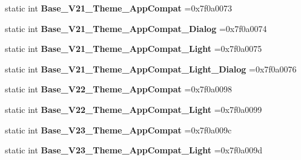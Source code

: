 \begin{DoxyCompactItemize}
static int {\bfseries Base\+\_\+\+V21\+\_\+\+Theme\+\_\+\+App\+Compat} =0x7f0a0073
\item 
\mbox{\label{classandroid_1_1support_1_1v7_1_1cardview_1_1R_1_1style_aefcd169fdb73165fb099d6b5d3257ef0}} 
static int {\bfseries Base\+\_\+\+V21\+\_\+\+Theme\+\_\+\+App\+Compat\+\_\+\+Dialog} =0x7f0a0074
\item 
\mbox{\label{classandroid_1_1support_1_1v7_1_1cardview_1_1R_1_1style_a4a02aac71d639ac5f302d376da529429}} 
static int {\bfseries Base\+\_\+\+V21\+\_\+\+Theme\+\_\+\+App\+Compat\+\_\+\+Light} =0x7f0a0075
\item 
\mbox{\label{classandroid_1_1support_1_1v7_1_1cardview_1_1R_1_1style_a4c6ac30e3b757ebf8f35eed8466346ec}} 
static int {\bfseries Base\+\_\+\+V21\+\_\+\+Theme\+\_\+\+App\+Compat\+\_\+\+Light\+\_\+\+Dialog} =0x7f0a0076
\item 
\mbox{\label{classandroid_1_1support_1_1v7_1_1cardview_1_1R_1_1style_ad559db67c0d62356014244b0c5908371}} 
static int {\bfseries Base\+\_\+\+V22\+\_\+\+Theme\+\_\+\+App\+Compat} =0x7f0a0098
\item 
\mbox{\label{classandroid_1_1support_1_1v7_1_1cardview_1_1R_1_1style_ac140cd6035d9bc7b85a6e93bdcbe0f8c}} 
static int {\bfseries Base\+\_\+\+V22\+\_\+\+Theme\+\_\+\+App\+Compat\+\_\+\+Light} =0x7f0a0099
\item 
\mbox{\label{classandroid_1_1support_1_1v7_1_1cardview_1_1R_1_1style_aaf5fe8797f658d6583b47cedc859b5d4}} 
static int {\bfseries Base\+\_\+\+V23\+\_\+\+Theme\+\_\+\+App\+Compat} =0x7f0a009c
\item 
\mbox{\label{classandroid_1_1support_1_1v7_1_1cardview_1_1R_1_1style_a6811b2661d69dc909651a30ba1292b22}} 
static int {\bfseries Base\+\_\+\+V23\+\_\+\+Theme\+\_\+\+App\+Compat\+\_\+\+Light} =0x7f0a009d
\item 
\mbox{\label{classandroid_1_1support_1_1v7_1_1cardview_1_1R_1_1style_a24ad6687b8997d953f3742b43b0f32c9}} 

\end{DoxyCompactItemize}
